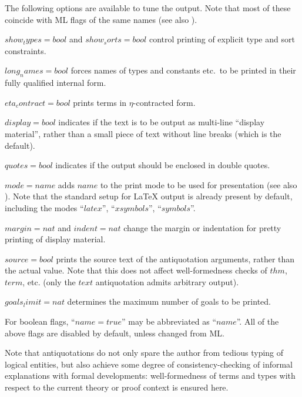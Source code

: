 \medskip

The following options are available to tune the output.  Note that most of
these coincide with ML flags of the same names (see also \cite{isabelle-ref}).
\begin{descr}
\item[$show_types = bool$ and $show_sorts = bool$] control printing of
  explicit type and sort constraints.
\item[$long_names = bool$] forces names of types and constants etc.\ to be
  printed in their fully qualified internal form.
\item[$eta_contract = bool$] prints terms in $\eta$-contracted form.
\item[$display = bool$] indicates if the text is to be output as multi-line
  ``display material'', rather than a small piece of text without line breaks
  (which is the default).
\item[$quotes = bool$] indicates if the output should be enclosed in double
  quotes.
\item[$mode = name$] adds $name$ to the print mode to be used for presentation
  (see also \cite{isabelle-ref}).  Note that the standard setup for {\LaTeX}
  output is already present by default, including the modes ``$latex$'',
  ``$xsymbols$'', ``$symbols$''.
\item[$margin = nat$ and $indent = nat$] change the margin or indentation for
  pretty printing of display material.
\item[$source = bool$] prints the source text of the antiquotation arguments,
  rather than the actual value.  Note that this does not affect
  well-formedness checks of $thm$, $term$, etc. (only the $text$ antiquotation
  admits arbitrary output).
\item[$goals_limit = nat$] determines the maximum number of goals to be
  printed.
\end{descr}

For boolean flags, ``$name = true$'' may be abbreviated as ``$name$''.  All of
the above flags are disabled by default, unless changed from ML.

\medskip Note that antiquotations do not only spare the author from tedious
typing of logical entities, but also achieve some degree of
consistency-checking of informal explanations with formal developments:
well-formedness of terms and types with respect to the current theory or proof
context is ensured here.


